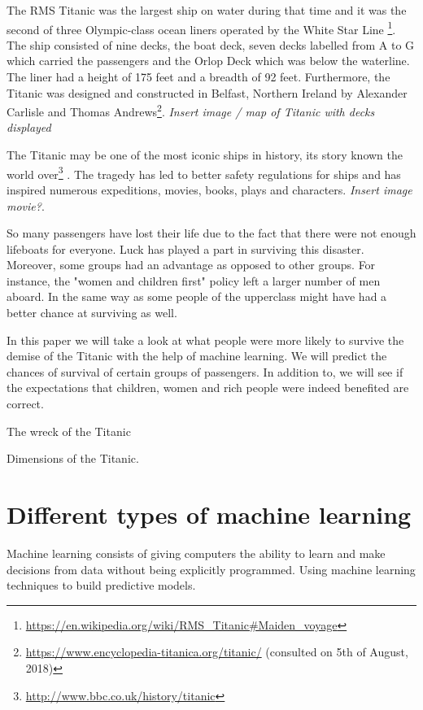 \documentclass[11pt]{article}
\begin{document}
The RMS Titanic was the largest ship on water during that time and it was the second of three Olympic-class ocean liners operated by the White Star Line \footnote{\url{https://en.wikipedia.org/wiki/RMS\_Titanic\#Maiden\_voyage}}. The ship consisted of nine decks, the boat deck, seven decks labelled from A to G which carried the passengers and the Orlop Deck which was below the waterline. The liner had a height of 175 feet and a breadth of 92 feet. Furthermore, the Titanic was designed and constructed in Belfast, Northern Ireland by Alexander Carlisle and Thomas Andrews\footnote{\url{https://www.encyclopedia-titanica.org/titanic/} (consulted on 5th of August, 2018)}. \emph{Insert image / map of Titanic with decks displayed}   

The Titanic may be one of the most iconic ships in history, its story known the world over\footnote{\url{http://www.bbc.co.uk/history/titanic}} . The tragedy has led to better safety regulations for ships and has inspired numerous expeditions, movies, books, plays and characters. \emph{Insert image movie?}. 

So many passengers have lost their life due to the fact that there were not enough lifeboats for everyone. Luck has played a part in surviving this disaster. Moreover, some groups had an advantage as opposed to other groups. For instance, the "women and children first" policy left a larger number of men aboard. In the same way as some people of the upperclass might have had a better chance at surviving as well. 

In this paper we will take a look at what people were more likely to survive the demise of the Titanic with the help of machine learning. We will predict the chances of survival of certain groups of passengers. In addition to, we will see if the expectations that children, women and rich people were indeed benefited are correct. 



The wreck of the Titanic

Dimensions of the Titanic. 

\section{Different types of machine learning}
\label{sec:org8de21d1}

Machine learning consists of giving computers the ability to learn and make decisions from data without being explicitly programmed. Using machine learning techniques to build predictive models.
\end{document}
